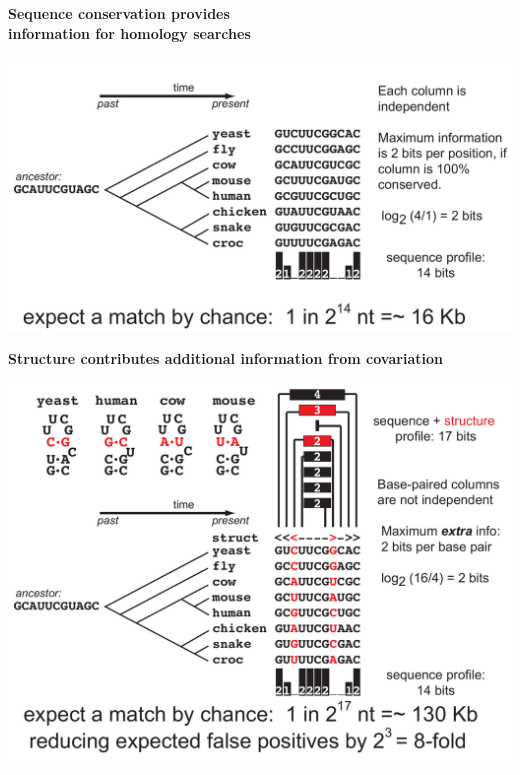 \documentclass[landscape]{slides}
\begin{document}
\begin{slide}
\begin{center}
\textbf{Sequence conservation provides \\ information for homology searches}
\medskip

\includegraphics[width=9in]{figs/seqstructprofiles-2014-seqinfo}
\end{center}

\vfill
\end{slide}
\begin{slide}
\begin{center}
\textbf{Structure contributes additional information from covariation}
\medskip

\includegraphics[width=9in]{figs/seqstructprofiles-2014-structinfo}
\end{center}

\vfill
\end{slide}
\end{document}
